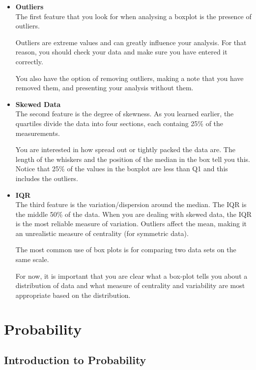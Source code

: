 \documentclass[12pt]{article}
\begin{document}
\begin{itemize} 
\item \textbf{Outliers}\\
The first feature that you look for when analysing a boxplot is the presence of outliers.
 
Outliers are extreme values and can greatly influence your analysis. For that reason, you should check your data and make sure you have entered it correctly.
 
You also have the option of removing outliers, making a note that you have removed them, and presenting your analysis without them.
 
\item \textbf{Skewed Data} \\
The second feature is the degree of skewness. As you learned earlier, the quartiles divide the data into four sections, each containg 25\% of the measurements. 

You are interested in how spread out or tightly packed the data are. The length of the whiskers and the position of the median in the box tell you this. Notice that 25\% of the values in the boxplot are less than Q1 and this includes the outliers.


\item \textbf{IQR} \\
The third feature is the variation/dispersion around the median. The IQR is the middle 50\% of the data. When you are dealing with skewed data, the IQR is the most reliable measure of variation. Outliers affect the mean, making it an unrealistic measure of centrality (for symmetric data).

The most common use of box plots is for comparing two data sets on the same scale. 

For now, it is important that you are clear what a box-plot tells you about a distribution of data and what measure of centrality and variability are most appropriate based on the distribution.

\end{itemize} 


\newpage
\section{Probability}

\subsection{Introduction to Probability}
\end{document}
